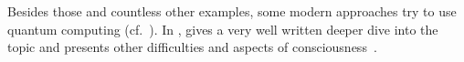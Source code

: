 Besides those and countless other examples, some modern approaches try to use quantum computing (cf.~\cite{saxena2013}).
In , \citeauthor{Meissner2020} gives a very well written deeper dive into the topic and presents other difficulties and aspects of consciousness~\cite{Meissner2020}.
